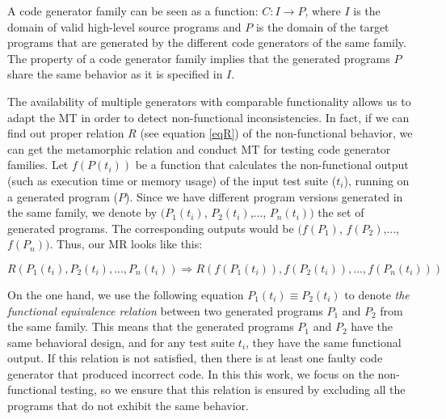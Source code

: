 A code generator family can be seen as a function: $C : I \rightarrow P$, where $I$ is the domain of valid high-level source programs and $P$ is the domain of the target programs that are generated by the different code generators of the same family. The property of a code generator family implies that the generated programs $P$ share the same behavior as it is specified in $I$. 

The availability of multiple generators with comparable functionality allows us to adapt the MT in order to detect non-functional inconsistencies. In fact, if we can find out proper relation $R$ (see equation \ref{eqR}) of the non-functional behavior, we can get the metamorphic relation and conduct MT for testing code generator families.
Let $f(P(t_{i}))$ be a function that calculates the non-functional output (such as execution time or memory usage) of the input test suite ($t_{i}$), running on a generated program ($P$). Since we have different program versions generated in the same family, we denote by $(P_{1}(t_{i})$, $P_{2}(t_{i})$,..., $P_{n}(t_{i}))$ the set of generated programs. The corresponding outputs would be $(f(P_{1})$, $f(P_{2})$,..., $f(P_{n}))$. Thus, our MR looks like this:

\begin{equation}
\label{eqR}
	 R(P_{1}(t_{i}), P_{2}(t_{i}),..., P_{n}(t_{i}))  \Rightarrow R(f(P_{1}(t_{i})), f(P_{2}(t_{i})),..., f(P_{n}(t_{i})))
\end{equation}

On the one hand, we use the following equation $P_{1}(t_{i}) \equiv P_{2}(t_{i})$ to denote \textit{the functional equivalence relation} between two generated programs $P_{1}$ and $P_{2}$ from the same family. This means that the generated programs $P_{1}$ and $P_{2}$ have the same behavioral design, and for any test suite $t_{i}$, they have the same functional output. 
If this relation is not satisfied, then there is at least one faulty code generator that produced incorrect code. In this this work, we focus on the non-functional testing, so we ensure that this relation is ensured by excluding all the programs that do not exhibit the same behavior. 


